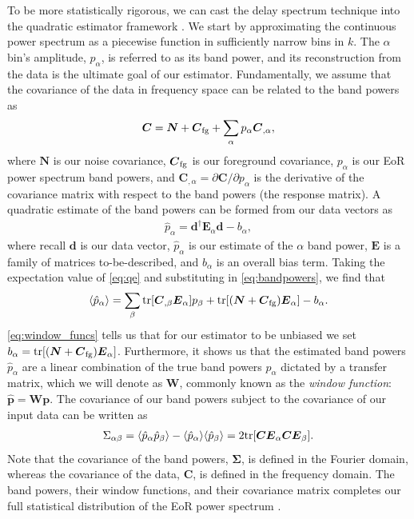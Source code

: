 \documentclass[a4paper,fleqn,usenatbib]{mnras}
\def\d{\boldsymbol{d}}
\def\E{\boldsymbol{E}}
\def\N{\boldsymbol{N}}
\def\p{\boldsymbol{p}}
\def\C{\boldsymbol{C}}
\def\W{\boldsymbol{W}}
\def\Cfg{\boldsymbol{C}_{\rm fg}}
\def\bSigma{\boldsymbol{\Sigma}}
\def\tr{{\rm tr}}
\begin{document}
To be more statistically rigorous, we can cast the delay spectrum technique into the quadratic estimator framework \citep{Hamilton1997, Tegmark1997, Liu2014a}.
We start by approximating the continuous power spectrum as a piecewise function in sufficiently narrow bins in $k$.
The $\alpha$ bin's amplitude, $p_\alpha$, is referred to as its band power, and its reconstruction from the data is the ultimate goal of our estimator.
Fundamentally, we assume that the covariance of the data in frequency space can be related to the band powers as
\begin{align}
\label{eq:bandpowers}
\C = \N + \Cfg + \sum_\alpha p_\alpha \C_{,\alpha},
\end{align}
where $\N$ is our noise covariance, $\Cfg$ is our foreground covariance, $p_\alpha$ is our EoR power spectrum band powers, and $\C_{,\alpha} = \partial\C/\partial p_\alpha$ is the derivative of the covariance matrix with respect to the band powers (the response matrix).
A quadratic estimate of the band powers can be formed from our data vectors as
\begin{align}
\label{eq:qe}
\hat{p}_\alpha = \d^\dagger\E_\alpha\d - b_\alpha,
\end{align}
where recall $\d$ is our data vector, $\hat{p}_\alpha$ is our estimate of the $\alpha$ band power, $\E$ is a family of matrices to-be-described, and $b_\alpha$ is an overall bias term.
Taking the expectation value of \autoref{eq:qe} and substituting in \autoref{eq:bandpowers}, we find that 
\begin{align}
\label{eq:window_funcs}
\langle\hat{p}_\alpha\rangle = \sum_\beta\tr[\C_{,\beta}\E_\alpha]p_{\beta} + \tr[(\N + \Cfg)\E_\alpha] - b_\alpha.
\end{align}
\autoref{eq:window_funcs} tells us that for our estimator to be unbiased we set $b_\alpha = \tr[(\N+\Cfg)\E_\alpha]$.
Furthermore, it shows us that the estimated band powers $\hat{p}_\alpha$ are a linear combination of the true band powers $p_\alpha$ dictated by a transfer matrix, which we will denote as $\W$, commonly known as the \emph{window function}: $\hat{\p} = \W\p$.
The covariance of our band powers subject to the covariance of our input data can be written as
\begin{align}
\label{eq:qe_C}
\Sigma_{\alpha\beta} = \langle \hat{p}_\alpha\hat{p}_\beta\rangle - \langle \hat{p}_\alpha\rangle\langle \hat{p}_\beta\rangle = 2\tr[\C\E_\alpha\C\E_\beta].
\end{align}
Note that the covariance of the band powers, $\bSigma$, is defined in the Fourier domain, whereas the covariance of the data, $\C$, is defined in the frequency domain.
The band powers, their window functions, and their covariance matrix completes our full statistical distribution of the EoR power spectrum \citep{Liu2014a}.
\end{document}
